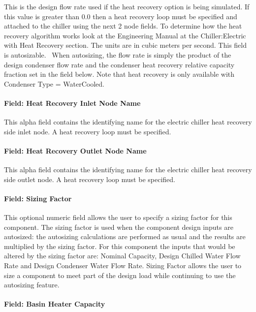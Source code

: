 This is the design flow rate used if the heat recovery option is being simulated. If this value is greater than 0.0 then a heat recovery loop must be specified and attached to the chiller using the next 2 node fields. To determine how the heat recovery algorithm works look at the Engineering Manual at the Chiller:Electric with Heat Recovery section. The units are in cubic meters per second. This field is autosizable.~ When autosizing, the flow rate is simply the product of the design condenser flow rate and the condenser heat recovery relative capacity fraction set in the field below. Note that heat recovery is only available with Condenser Type = WaterCooled.

\paragraph{Field: Heat Recovery Inlet Node Name}\label{field-heat-recovery-inlet-node-name-000}

This alpha field contains the identifying name for the electric chiller heat recovery side inlet node. A heat recovery loop must be specified.

\paragraph{Field: Heat Recovery Outlet Node Name}\label{field-heat-recovery-outlet-node-name-000}

This alpha field contains the identifying name for the electric chiller heat recovery side outlet node. A heat recovery loop must be specified.

\paragraph{Field: Sizing Factor}\label{field-sizing-factor-3-000}

This optional numeric field allows the user to specify a sizing factor for this component. The sizing factor is used when the component design inputs are autosized: the autosizing calculations are performed as usual and the results are multiplied by the sizing factor. For this component the inputs that would be altered by the sizing factor are: Nominal Capacity, Design Chilled Water Flow Rate and Design Condenser Water Flow Rate. Sizing Factor allows the user to size a component to meet part of the design load while continuing to use the autosizing feature.

\paragraph{Field: Basin Heater Capacity}\label{field-basin-heater-capacity-1-001}

